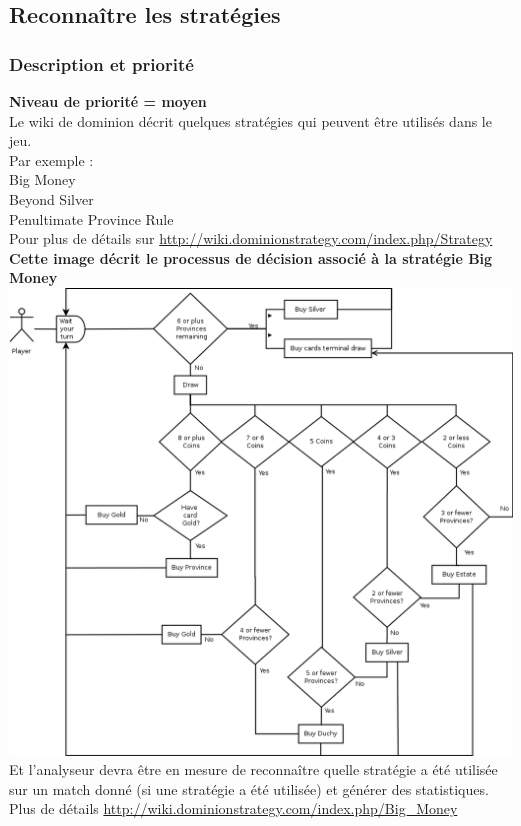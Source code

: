 \documentclass{scrreprt}
\begin{document}
\subsection{Reconnaître les stratégies}
\subsubsection{Description et priorité}
\textbf{Niveau de priorité = moyen}\\

Le wiki de dominion décrit quelques stratégies qui peuvent être utilisés dans le jeu.\\Par exemple :\\
Big Money\\
Beyond Silver\\
Penultimate Province Rule\\
Pour plus de détails sur \url{http://wiki.dominionstrategy.com/index.php/Strategy}\\



\textbf{Cette image décrit le processus de décision associé à la stratégie Big Money}\\
\includegraphics[width=\textwidth,height=\textheight,keepaspectratio]{big-money}\\
Et l'analyseur devra être en mesure de reconnaître quelle stratégie a été utilisée sur un match donné (si une  stratégie a été utilisée) et générer des statistiques.\\
Plus de détails \url{http://wiki.dominionstrategy.com/index.php/Big_Money}\\
\end{document}
